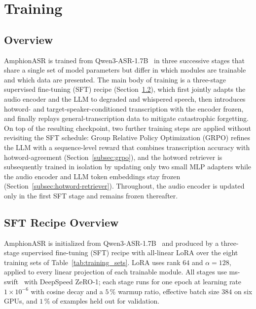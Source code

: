 \section{Training}
\label{sec:training}

\subsection{Overview}
\label{subsec:training-overview}

AmphionASR is trained from
Qwen3-ASR-1.7B~\cite{qwen2025qwen3asr} in three successive stages that share a
single set of model parameters but differ in which modules are trainable
and which data are presented. The main body of training is a three-stage
supervised fine-tuning (SFT) recipe
(Section~\ref{subsec:sft-recipe}), which first jointly adapts the audio
encoder and the LLM to degraded and whispered speech, then introduces
hotword- and target-speaker-conditioned transcription with the encoder
frozen, and finally replays general-transcription data to mitigate
catastrophic forgetting. On top of the resulting checkpoint, two further
training steps are applied without revisiting the SFT schedule: Group
Relative Policy Optimization (GRPO) refines the LLM with a
sequence-level reward that combines transcription accuracy with
hotword-agreement (Section~\ref{subsec:grpo}), and the hotword
retriever is subsequently trained in isolation by updating only two
small MLP adapters while the audio encoder and LLM token embeddings
stay frozen (Section~\ref{subsec:hotword-retriever}). Throughout, the
audio encoder is updated only in the first SFT stage and remains frozen
thereafter.

\subsection{SFT Recipe Overview}
\label{subsec:sft-recipe}

AmphionASR is initialized from
Qwen3-ASR-1.7B~\cite{qwen2025qwen3asr} and produced by a
three-stage supervised fine-tuning (SFT) recipe with all-linear LoRA
over the eight training sets of Table~\ref{tab:training_sets}.
LoRA uses rank $64$ and $\alpha=128$, applied to every linear
projection of each trainable module. All stages use
ms-swift~\cite{msswift} with DeepSpeed ZeRO-1; each stage runs for
one epoch at learning rate $1\!\times\!10^{-6}$ with cosine decay and
a $5$\,\% warmup ratio, effective batch size $384$ on six GPUs, and
$1$\,\% of examples held out for validation.

